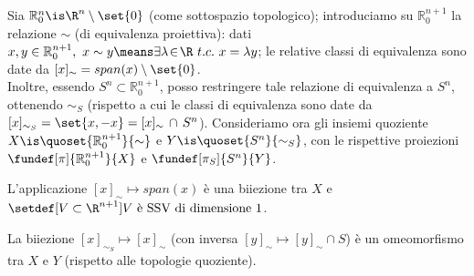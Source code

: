 

\newcommand*\Ps{\mathbb{P}} %
\newcommand*\Ro[1][n]{\mathbb{R}_0^{#1}} %
\newcommand*\tc{\ t.c. \ } %

Sia $\Ro \is \R^n \setminus \set{0}$ (come sottospazio topologico); introduciamo su $\Ro[n+1]$ la relazione $\sim $ (di equivalenza proiettiva): dati $x, y \in \Ro[n+1], \ x \sim y \means  \exists \lambda \! \in \! \R \tc x = \lambda y $; le relative classi di equivalenza sono date da $[x]_\sim = span(x) \setminus \set{0}$. \\
Inoltre, essendo $S^n \subset \Ro[n+1]$, posso restringere tale relazione di equivalenza a $S^n$, ottenendo $\sim_S$ (rispetto a cui le classi di equivalenza sono date da $[x]_{\sim_S} = \set{x, -x} = [x]_\sim \, \cap \, S^n$).
Consideriamo ora gli insiemi quoziente $X \is \quoset{\Ro[n+1]}{\sim}$ e $Y \is \quoset{S^n}{\sim_S}$, con le rispettive proiezioni $\fundef[\pi]{\Ro[n+1]}{X}$ e $\fundef[\pi_S]{S^n}{Y}$.

\begin{oss}
	L'applicazione $[x]_\sim \! \mapsto \! span(x)$ è una biiezione tra $X$ e \break
	$\setdef[V \subset \R^{n+1}]{\text{$V$ è SSV di dimensione 1}}$.
\end{oss}

\begin{prop}
	La biiezione $[x]_{\sim_S} \! \mapsto \! [x]_\sim$ (con inversa $[y]_\sim \! \mapsto \! [y]_\sim \cap S$) è un omeomorfismo tra $X$ e $Y$ (rispetto alle topologie quoziente).
\end{prop}
